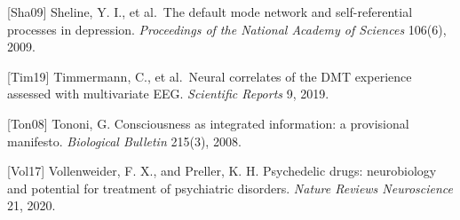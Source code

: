 \documentclass[
  11pt,
  letterpaper,
]{article}
\begin{document}
{[}Sha09{]} Sheline, Y. I., et al.~The default mode network and
self-referential processes in depression. \emph{Proceedings of the
National Academy of Sciences} 106(6), 2009.

{[}Tim19{]} Timmermann, C., et al.~Neural correlates of the DMT
experience assessed with multivariate EEG. \emph{Scientific Reports} 9,
2019.

{[}Ton08{]} Tononi, G. Consciousness as integrated information: a
provisional manifesto. \emph{Biological Bulletin} 215(3), 2008.

{[}Vol17{]} Vollenweider, F. X., and Preller, K. H. Psychedelic drugs:
neurobiology and potential for treatment of psychiatric disorders.
\emph{Nature Reviews Neuroscience} 21, 2020.
\end{document}
